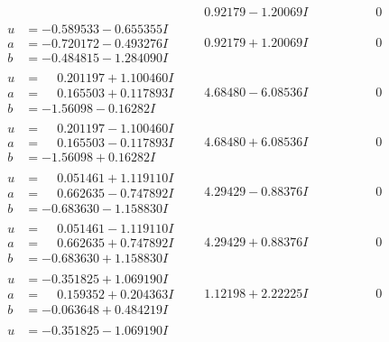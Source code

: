 \documentclass[1p]{elsarticle_modified}
\theoremstyle{definition}
\begin{document}
$$\begin{array}{c|c|c}
 & \phantom{-}0.92179 - 1.20069 I & \phantom{-0.000000 } 0 \\ \hline\begin{aligned}
u &= -0.589533 - 0.655355 I \\
a &= -0.720172 - 0.493276 I \\
b &= -0.484815 - 1.284090 I\end{aligned}
 & \phantom{-}0.92179 + 1.20069 I & \phantom{-0.000000 } 0 \\ \hline\begin{aligned}
u &= \phantom{-}0.201197 + 1.100460 I \\
a &= \phantom{-}0.165503 + 0.117893 I \\
b &= -1.56098 - 0.16282 I\end{aligned}
 & \phantom{-}4.68480 - 6.08536 I & \phantom{-0.000000 } 0 \\ \hline\begin{aligned}
u &= \phantom{-}0.201197 - 1.100460 I \\
a &= \phantom{-}0.165503 - 0.117893 I \\
b &= -1.56098 + 0.16282 I\end{aligned}
 & \phantom{-}4.68480 + 6.08536 I & \phantom{-0.000000 } 0 \\ \hline\begin{aligned}
u &= \phantom{-}0.051461 + 1.119110 I \\
a &= \phantom{-}0.662635 - 0.747892 I \\
b &= -0.683630 - 1.158830 I\end{aligned}
 & \phantom{-}4.29429 - 0.88376 I & \phantom{-0.000000 } 0 \\ \hline\begin{aligned}
u &= \phantom{-}0.051461 - 1.119110 I \\
a &= \phantom{-}0.662635 + 0.747892 I \\
b &= -0.683630 + 1.158830 I\end{aligned}
 & \phantom{-}4.29429 + 0.88376 I & \phantom{-0.000000 } 0 \\ \hline\begin{aligned}
u &= -0.351825 + 1.069190 I \\
a &= \phantom{-}0.159352 + 0.204363 I \\
b &= -0.063648 + 0.484219 I\end{aligned}
 & \phantom{-}1.12198 + 2.22225 I & \phantom{-0.000000 } 0 \\ \hline\begin{aligned}
u &= -0.351825 - 1.069190 I \\

\end{aligned}
\end{array}$$
\end{document}
